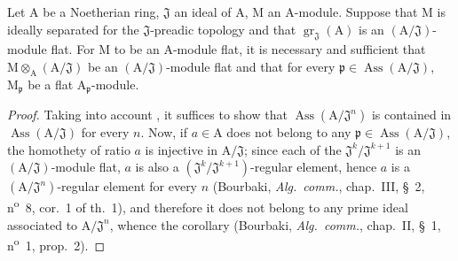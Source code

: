 \begin{corollary}[11.4.10]
\label{IV.11.4.10}
Let $\mathrm{A}$ be a Noetherian ring, $\mathfrak{J}$ an ideal of $\mathrm{A}$, $\mathrm{M}$ an $\mathrm{A}$-module.
Suppose that $\mathrm{M}$ is ideally separated for the $\mathfrak{J}$-preadic topology and that $\operatorname{gr}_\mathfrak{J}(\mathrm{A})$ is an
$(\mathrm{A}/\mathfrak{J})$-module flat. For $\mathrm{M}$ to be an $\mathrm{A}$-module flat, it is necessary and sufficient that $\mathrm{M}\otimes_\mathrm{A}(\mathrm{A}/\mathfrak{J})$ be
an $(\mathrm{A}/\mathfrak{J})$-module flat and that for every $\mathfrak{p}\in\operatorname{Ass}(\mathrm{A}/\mathfrak{J})$, $\mathrm{M}_\mathfrak{p}$ be a flat $\mathrm{A}_\mathfrak{p}$-module.
\end{corollary}

\begin{proof}
Taking into account , it suffices to show that $\operatorname{Ass}(\mathrm{A}/\mathfrak{J}^n)$ is contained in
$\operatorname{Ass}(\mathrm{A}/\mathfrak{J})$ for every $n$. Now, if $a\in\mathrm{A}$ does not belong to any $\mathfrak{p}\in\operatorname{Ass}(\mathrm{A}/\mathfrak{J})$, the homothety
of ratio $a$ is injective in $\mathrm{A}/\mathfrak{J}$; since each of the $\mathfrak{J}^k/\mathfrak{J}^{k+1}$ is an $(\mathrm{A}/\mathfrak{J})$-module
flat, $a$ is also a $(\mathfrak{J}^k/\mathfrak{J}^{k+1})$-regular element, hence $a$ is a $(\mathrm{A}/\mathfrak{J}^n)$-regular element for every $n$
(Bourbaki, \emph{Alg.\ comm.}, chap.~III, \S~2, n\textsuperscript{o}~8, cor.~1 of th.~1), and therefore it does not belong
to any prime ideal associated to $\mathrm{A}/\mathfrak{J}^n$, whence the corollary (Bourbaki, \emph{Alg.\ comm.}, chap.~II,
\S~1, n\textsuperscript{o}~1, prop.~2).
\end{proof}

